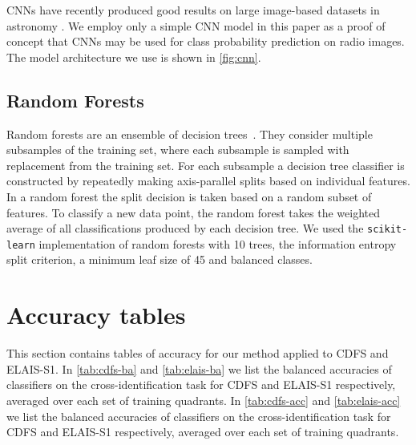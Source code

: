     CNNs have recently produced good results on large image-based datasets in
    astronomy \citep[e.g.]{lukic18compact, dieleman15cnn}. We employ
    only a simple CNN model in this paper as a proof of concept that CNNs may
    be used for class probability prediction on radio images. The model
    architecture we use is shown in \autoref{fig:cnn}.

  \subsection{Random Forests}
  \label{sec:atlas-random-forests}

    Random forests are an ensemble of decision
    trees~\citep{breiman01random-forest}. They consider multiple subsamples of
    the training set, where each subsample is sampled with replacement from
    the training set. For each subsample a decision tree classifier is
    constructed by repeatedly making axis-parallel splits based on individual
    features. In a random forest the split decision is taken based on a random
    subset of features. To classify a new data point, the random forest takes
    the weighted average of all classifications produced by each decision
    tree. {We used the \texttt{scikit-learn} \citep{pedregosa11sklearn}
    implementation of random forests with 10 trees, the information entropy
    split criterion, a minimum leaf size of 45 and balanced classes}.

\section{Accuracy tables}\label{sec:atlas-xid-accuracies}
  
  This section contains tables of accuracy for our method applied to CDFS and
  ELAIS-S1. In \autoref{tab:cdfs-ba} and \autoref{tab:elais-ba} we list the
  balanced accuracies of classifiers on the cross-identification task for CDFS
  and ELAIS-S1 respectively, averaged over each set of training quadrants. In
  \autoref{tab:cdfs-acc} and \autoref{tab:elais-acc} we list the balanced
  accuracies of classifiers on the cross-identification task for CDFS and
  ELAIS-S1 respectively, averaged over each set of training quadrants.

